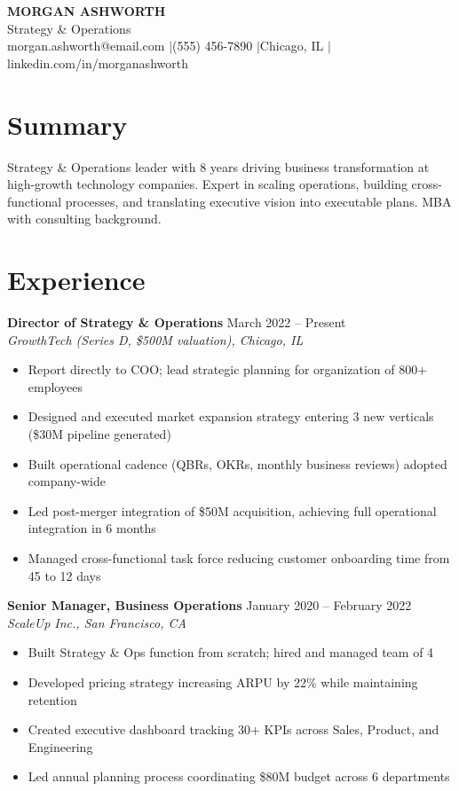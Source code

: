 \documentclass[11pt,a4paper]{article}
\begin{document}
\begin{center}
{\LARGE\sffamily\bfseries\color{accent} MORGAN ASHWORTH}\\[0.4em]
{\large Strategy \& Operations}\\[0.3em]
{\small morgan.ashworth@email.com \quad$\vert$\quad (555) 456-7890 \quad$\vert$\quad Chicago, IL \quad$\vert$\quad linkedin.com/in/morganashworth}
\end{center}

\section{Summary}
Strategy \& Operations leader with 8 years driving business transformation at high-growth technology companies. Expert in scaling operations, building cross-functional processes, and translating executive vision into executable plans. MBA with consulting background.

\section{Experience}

\noindent\textbf{Director of Strategy \& Operations} \hfill March 2022 -- Present\\
\textit{GrowthTech (Series D, \$500M valuation), Chicago, IL}
\begin{itemize}[leftmargin=1.5em,nosep,label={\color{accent}\textendash}]
\item Report directly to COO; lead strategic planning for organization of 800+ employees
\item Designed and executed market expansion strategy entering 3 new verticals (\$30M pipeline generated)
\item Built operational cadence (QBRs, OKRs, monthly business reviews) adopted company-wide
\item Led post-merger integration of \$50M acquisition, achieving full operational integration in 6 months
\item Managed cross-functional task force reducing customer onboarding time from 45 to 12 days
\end{itemize}
\vspace{0.5em}

\noindent\textbf{Senior Manager, Business Operations} \hfill January 2020 -- February 2022\\
\textit{ScaleUp Inc., San Francisco, CA}
\begin{itemize}[leftmargin=1.5em,nosep,label={\color{accent}\textendash}]
\item Built Strategy \& Ops function from scratch; hired and managed team of 4
\item Developed pricing strategy increasing ARPU by 22\% while maintaining retention
\item Created executive dashboard tracking 30+ KPIs across Sales, Product, and Engineering
\item Led annual planning process coordinating \$80M budget across 6 departments
\end{itemize}
\vspace{0.5em}
\end{document}
